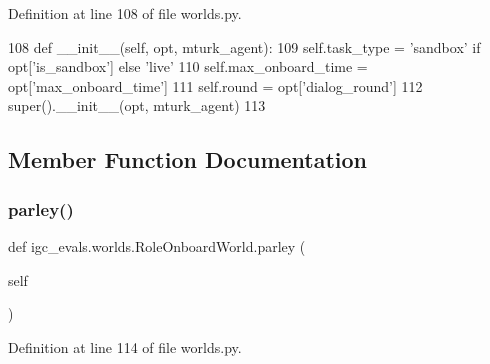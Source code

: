 Definition at line 108 of file worlds.\+py.


\begin{DoxyCode}
108     \textcolor{keyword}{def }\_\_init\_\_(self, opt, mturk\_agent):
109         self.task\_type = \textcolor{stringliteral}{'sandbox'} \textcolor{keywordflow}{if} opt[\textcolor{stringliteral}{'is\_sandbox'}] \textcolor{keywordflow}{else} \textcolor{stringliteral}{'live'}
110         self.max\_onboard\_time = opt[\textcolor{stringliteral}{'max\_onboard\_time'}]
111         self.round = opt[\textcolor{stringliteral}{'dialog\_round'}]
112         super().\_\_init\_\_(opt, mturk\_agent)
113 
\end{DoxyCode}


\subsection{Member Function Documentation}
\mbox{\label{classigc__evals_1_1worlds_1_1RoleOnboardWorld_a84185551f87f342eb5aa827e6d4bc520}} 
\subsubsection{\texorpdfstring{parley()}{parley()}}
{\footnotesize\ttfamily def igc\+\_\+evals.\+worlds.\+Role\+Onboard\+World.\+parley (\begin{DoxyParamCaption}\item[{}]{self }\end{DoxyParamCaption})}



Definition at line 114 of file worlds.\+py.


